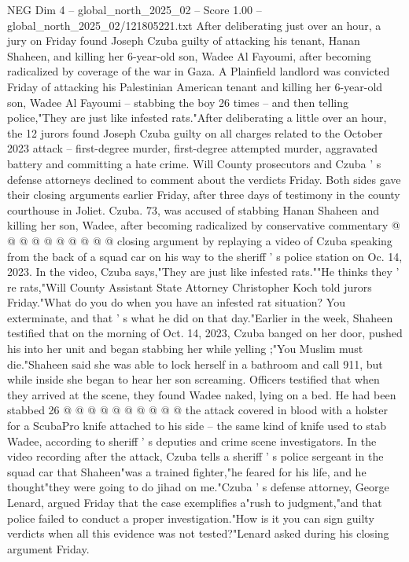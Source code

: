 \begin{textsample}{NEG Dim 4 – global\_north\_2025\_02 – Score 1.00 – global\_north\_2025\_02/121805221.txt}  \label{ex:f4_neg_404}
After deliberating just over an hour, a jury on Friday found Joseph Czuba guilty of attacking his tenant, Hanan Shaheen, and killing her 6-year-old son, Wadee Al Fayoumi, after becoming radicalized by coverage of the war in Gaza.
A Plainfield landlord was convicted Friday of attacking his Palestinian American tenant and killing her 6-year-old son, Wadee Al Fayoumi -- stabbing the boy 26 times -- and then telling police,"They are just like infested rats."After deliberating a little over an hour, the 12 jurors found Joseph Czuba guilty on all charges related to the October 2023 attack -- first-degree murder, first-degree attempted murder, aggravated battery and committing a hate crime.
Will County prosecutors and Czuba ' s defense attorneys declined to comment about the verdicts Friday.
Both sides gave their closing arguments earlier Friday, after three days of testimony in the county courthouse in Joliet.
Czuba. 73, was accused of stabbing Hanan Shaheen and killing her son, Wadee, after becoming radicalized by conservative commentary @ @ @ @ @ @ @ @ @ @ closing argument by replaying a video of Czuba speaking from the back of a squad car on his way to the sheriff ' s police station on Oc. 14, 2023.
In the video, Czuba says,"They are just like infested rats.""He thinks they ' re rats,"Will County Assistant State Attorney Christopher Koch told jurors Friday."What do you do when you have an infested rat situation?
You exterminate, and that ' s what he did on that day."Earlier in the week, Shaheen testified that on the morning of Oct. 14, 2023, Czuba banged on her door, pushed his into her unit and began stabbing her while yelling ;"You Muslim must die."Shaheen said she was able to lock herself in a bathroom and call 911, but while inside she began to hear her son screaming.
Officers testified that when they arrived at the scene, they found Wadee naked, lying on a bed.
He had been stabbed 26 @ @ @ @ @ @ @ @ @ @ the attack covered in blood with a holster for a ScubaPro knife attached to his side -- the same kind of knife used to stab Wadee, according to sheriff ' s deputies and crime scene investigators.
In the video recording after the attack, Czuba tells a sheriff ' s police sergeant in the squad car that Shaheen"was a trained fighter,"he feared for his life, and he thought"they were going to do jihad on me."Czuba ' s defense attorney, George Lenard, argued Friday that the case exemplifies a"rush to judgment,"and that police failed to conduct a proper investigation."How is it you can sign guilty verdicts when all this evidence was not tested?"Lenard asked during his closing argument Friday.

\end{textsample}
